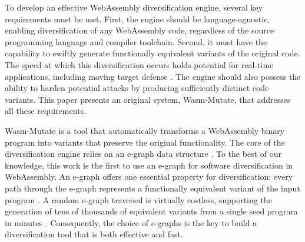 \documentclass[a4paper,fleqn]{cas-dc}
\newcommand*\badge[1]{ \colorbox{red}{\color{white}#1}}
\newcommand{\tool}{{\sc Wasm-Mutate}\xspace}
\newcommand{\Wasm}{WebAssembly\xspace}
\newcommand{\wasm}{\Wasm}
\newcommand{\todo}[1]{%
\refstepcounter{todo}
\noindent\textbf{\badge{TODO}} {\color{red}#1}
\addcontentsline{td}{todo}
{\color{red}\thesection.\thetodo\xspace #1}}
\begin{document}
To develop an effective \wasm diversification engine, several key requirements must be met. 
First, the engine should be language-agnostic, enabling diversification of any \Wasm code, regardless of the source programming language and compiler toolchain.
Second, it must have the capability to swiftly generate functionally equivalent variants of the original code. 
The speed at which this diversification occurs holds potential for real-time applications, including moving target defense \cite{MEWE}. 
The engine should also possess the ability to harden potential attacks by producing sufficiently distinct code variants.
This paper presents an original system, \tool, that addresses all these requirements.

\tool is a tool that automatically transforms a \wasm binary program into variants that preserve the original functionality. 
The core of the diversification engine relies on an e-graph data structure \cite{10.1145/3434304}.
To the best of our knowledge, this work is the first to use an e-graph for software diversification in \Wasm. An e-graph offers one essential property for diversification:  every path through the e-graph represents a functionally equivalent variant of the input program \cite{10.1145/3434304, 10.1145/3385412.3386001}.  
A random e-graph traversal is virtually costless, supporting the generation of tens of thousands of equivalent variants from a single seed program in minutes \cite{10.1145/3547622}. 
Consequently, the choice of e-graphs is the key to build a diversification tool that is both effective and fast.
\end{document}
